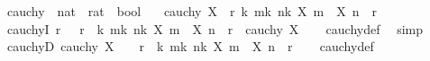 \begin{isabellebody}
\isanewline
{}\isamarkupfalse%
%
\endisatagproof
{\isafoldproof}%
%
\isadelimproof
%
\endisadelimproof
%
\isadelimdocument
%
\endisadelimdocument
%
\isatagdocument
%
\isamarkuptrue%
%
\endisatagdocument
{\isafolddocument}%
%
\isadelimdocument
%
\endisadelimdocument
{}\isamarkupfalse%
\ cauchy\ {\isacharcolon}{\kern0pt}{\isacharcolon}{\kern0pt}\ {\isachardoublequoteopen}{\isacharparenleft}{\kern0pt}nat\ {\isasymRightarrow}\ rat{\isacharparenright}{\kern0pt}\ {\isasymRightarrow}\ bool{\isachardoublequoteclose}\isanewline
\ \ \ {\isachardoublequoteopen}cauchy\ X\ {\isasymlongleftrightarrow}\ {\isacharparenleft}{\kern0pt}{\isasymforall}r{\isachargreater}{\kern0pt}{}{\isachardot}{\kern0pt}\ {\isasymexists}k{\isachardot}{\kern0pt}\ {\isasymforall}m{\isasymge}k{\isachardot}{\kern0pt}\ {\isasymforall}n{\isasymge}k{\isachardot}{\kern0pt}\ {\isasymbar}X\ m\ {\isacharminus}{\kern0pt}\ X\ n{\isasymbar}\ {\isacharless}{\kern0pt}\ r{\isacharparenright}{\kern0pt}{\isachardoublequoteclose}\isanewline
\isanewline
{}\isamarkupfalse%
\ cauchyI{\isacharcolon}{\kern0pt}\ {\isachardoublequoteopen}{\isacharparenleft}{\kern0pt}{\isasymAnd}r{\isachardot}{\kern0pt}\ {}\ {\isacharless}{\kern0pt}\ r\ {\isasymLongrightarrow}\ {\isasymexists}k{\isachardot}{\kern0pt}\ {\isasymforall}m{\isasymge}k{\isachardot}{\kern0pt}\ {\isasymforall}n{\isasymge}k{\isachardot}{\kern0pt}\ {\isasymbar}X\ m\ {\isacharminus}{\kern0pt}\ X\ n{\isasymbar}\ {\isacharless}{\kern0pt}\ r{\isacharparenright}{\kern0pt}\ {\isasymLongrightarrow}\ cauchy\ X{\isachardoublequoteclose}\isanewline
%
\isadelimproof
\ \ %
\endisadelimproof
%
\isatagproof
{}\isamarkupfalse%
\ cauchy{\isacharunderscore}{\kern0pt}def\ \isamarkupfalse%
\ simp%
\endisatagproof
{\isafoldproof}%
%
\isadelimproof
\isanewline
%
\endisadelimproof
\isanewline
{}\isamarkupfalse%
\ cauchyD{\isacharcolon}{\kern0pt}\ {\isachardoublequoteopen}cauchy\ X\ {\isasymLongrightarrow}\ {}\ {\isacharless}{\kern0pt}\ r\ {\isasymLongrightarrow}\ {\isasymexists}k{\isachardot}{\kern0pt}\ {\isasymforall}m{\isasymge}k{\isachardot}{\kern0pt}\ {\isasymforall}n{\isasymge}k{\isachardot}{\kern0pt}\ {\isasymbar}X\ m\ {\isacharminus}{\kern0pt}\ X\ n{\isasymbar}\ {\isacharless}{\kern0pt}\ r{\isachardoublequoteclose}\isanewline
%
\isadelimproof
\ \ %
\endisadelimproof
%
\isatagproof
{}\isamarkupfalse%
\ cauchy{\isacharunderscore}{\kern0pt}def\ \isamarkupfalse%

\end{isabellebody}
